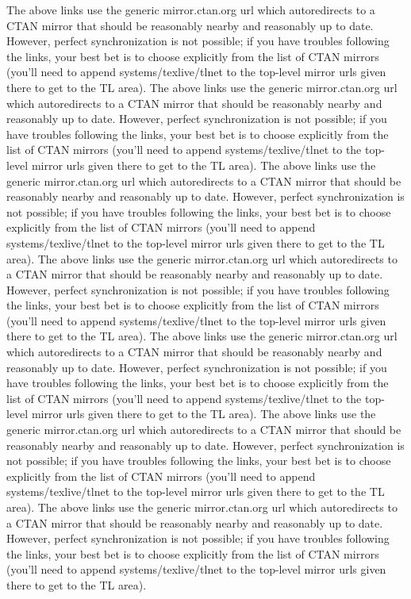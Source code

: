 \documentclass[ngerman]{scrartcl}
\begin{document}
The above links use the generic mirror.ctan.org url which autoredirects to a CTAN mirror that should be reasonably nearby and reasonably up to date. However, perfect synchronization is not possible; if you have troubles following the links, your best bet is to choose explicitly from the list of CTAN mirrors (you'll need to append systems/texlive/tlnet to the top-level mirror urls given there to get to the TL area). The above links use the generic mirror.ctan.org url which autoredirects to a CTAN mirror that should be reasonably nearby and reasonably up to date. However, perfect synchronization is not possible; if you have troubles following the links, your best bet is to choose explicitly from the list of CTAN mirrors (you'll need to append systems/texlive/tlnet to the top-level mirror urls given there to get to the TL area). The above links use the generic mirror.ctan.org url which autoredirects to a CTAN mirror that should be reasonably nearby and reasonably up to date. However, perfect synchronization is not possible; if you have troubles following the links, your best bet is to choose explicitly from the list of CTAN mirrors (you'll need to append systems/texlive/tlnet to the top-level mirror urls given there to get to the TL area). The above links use the generic mirror.ctan.org url which autoredirects to a CTAN mirror that should be reasonably nearby and reasonably up to date. However, perfect synchronization is not possible; if you have troubles following the links, your best bet is to choose explicitly from the list of CTAN mirrors (you'll need to append systems/texlive/tlnet to the top-level mirror urls given there to get to the TL area). The above links use the generic mirror.ctan.org url which autoredirects to a CTAN mirror that should be reasonably nearby and reasonably up to date. However, perfect synchronization is not possible; if you have troubles following the links, your best bet is to choose explicitly from the list of CTAN mirrors (you'll need to append systems/texlive/tlnet to the top-level mirror urls given there to get to the TL area). The above links use the generic mirror.ctan.org url which autoredirects to a CTAN mirror that should be reasonably nearby and reasonably up to date. However, perfect synchronization is not possible; if you have troubles following the links, your best bet is to choose explicitly from the list of CTAN mirrors (you'll need to append systems/texlive/tlnet to the top-level mirror urls given there to get to the TL area). The above links use the generic mirror.ctan.org url which autoredirects to a CTAN mirror that should be reasonably nearby and reasonably up to date. However, perfect synchronization is not possible; if you have troubles following the links, your best bet is to choose explicitly from the list of CTAN mirrors (you'll need to append systems/texlive/tlnet to the top-level mirror urls given there to get to the TL area). 
\end{document}
